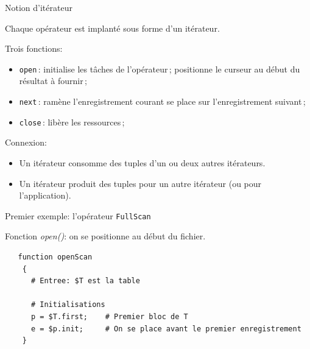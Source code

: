 \begin{frame}{Notion d'itérateur}

Chaque opérateur est implanté sous forme d'un \alert{itérateur}.

\vfill

Trois fonctions:

\begin{itemize}
  \item \texttt{open}\,: initialise les tâches de l'opérateur\,; 
            positionne le curseur au début du résultat à fournir\,;
   
  \item \texttt{next}\,: ramène l'enregistrement courant\;
          se place sur l'enregistrement suivant\,;

  \item \texttt{close}\,: libère les ressources\,;
\end{itemize}

\vfill

Connexion: 
\begin{itemize}
  \item Un itérateur \alert{consomme} des tuples d'un ou deux autres itérateurs.
  \item Un itérateur \alert{produit} des tuples pour un autre
     itérateur (ou pour l'application).
\end{itemize}  

\end{frame}


\begin{frame}[fragile]{Premier exemple: l'opérateur \texttt{FullScan}}

Fonction \textit{open()}: on se positionne au début du fichier.

\begin{verbatim}
   function openScan 
    {
      # Entree: $T est la table 
      
      # Initialisations
      p = $T.first;    # Premier bloc de T
      e = $p.init;     # On se place avant le premier enregistrement
    }
\end{verbatim}

\end{frame}


